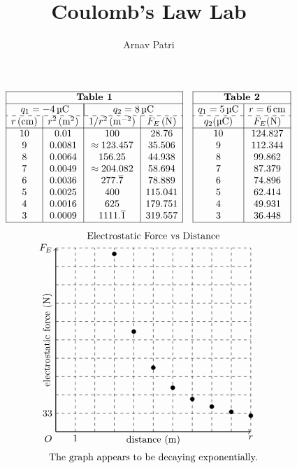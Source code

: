 \documentclass[A4, 12pt]{article}
\title{Coulomb's Law Lab}
\author{Arnav Patri}
\begin{document}
	\maketitle
	\begin{align*}
		\begin{array}{|*4{c|}}\hline
			\multicolumn{4}{|c|}{\textbf{Table 1}} \\\hline
			\multicolumn{2}{|c|}{q_1 = \SI{-4}{\micro C}} & \multicolumn{2}{|c|}{q_2 = \SI{8}{\micro C}} \\\hdashline
			r \,(\SI{}{cm}) & r^2 \,(\SI{}{m^2}) & 1/r^2 \,(\SI{}{m^{-2}}) & F_E \,(\SI{}{N}) \\\hline
			10 & 0.01 & 100 & 28.76\\
			9 & 0.0081 & \approx 123.457 & 35.506 \\
			8 & 0.0064 & 156.25 & 44.938 \\
			7 & 0.0049 & \approx 204.082 & 58.694 \\
			6 & 0.0036 & 277.\overline{7} & 78.889 \\
			5 & 0.0025 & 400 & 115.041 \\
			4 & 0.0016 & 625 & 179.751 \\
			3 & 0.0009 & 1111.\overline{1} & 319.557 \\\hline
		\end{array} &&
		\begin{array}{|*2{c|}}\hline
			\multicolumn{2}{|c|}{\textbf{Table 2}} \\\hline
			q_1 = \SI{5}{\micro C} & r = \SI{6}{cm} \\\hdashline
			q_2 (\SI{}{\micro C}) & F_E (\SI{}{N}) \\\hline
			10 & 124.827 \\
			9 & 112.344 \\
			8 & 99.862 \\
			7 & 87.379 \\
			6 & 74.896 \\
			5 & 62.414 \\
			4 & 49.931 \\
			3 & 36.448 \\\hline
		\end{array}
	\end{align*}
	\[\begin{tikzpicture}[x = 7mm, y = 0.2mm]
		\node[above] at (5, 340) {Electrostatic Force vs Distance};
		\draw[thick, ->] (0, 0) node[anchor = north east]{\(O\)} -- (10, 0) node[below]{\(r\)};
			\node[below] at (5, 0) {distance (\SI{}{m})};
		\draw[thick, ->] (0, 0) -- (0, 330) node[left]{\(F_E\)};
			\node[rotate = 90, above] at (0, 165) {electrostatic force (\SI{}{N})};
		\foreach \x in {1,..., 10}
			\draw[dashed] (0, \x * 33) -- (10, \x * 33);
		\foreach \x in {1,..., 10}
			\draw[dashed] (\x, 0) -- (\x, 330);
		\node[below] at (1, 0) {1};
		\node[left] at (0, 33) {33};
		\foreach \x/\y in {10/28.76, 9/35.506, 8/44.938, 7/58.694, 6/78.889, 5/115.041, 4/179.751, 3/319.557}
			\filldraw (\x, \y) circle (0.75mm);
		\node[below] at (5, -33) {The graph appears to be decaying exponentially.};
		\end{tikzpicture}\]
\end{document}
